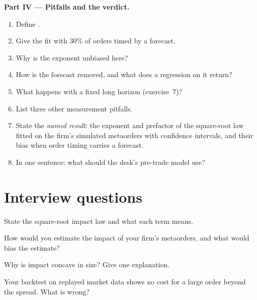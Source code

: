 \begin{problem}
\medskip\noindent\textbf{Part IV --- Pitfalls and the verdict.}
\begin{enumerate}[resume]
\item Define .
\item Give the fit with 30\% of orders timed by a forecast.
\item Why is the exponent unbiased here?
\item How is the forecast removed, and what does a regression on it return?
\item What happens with a fixed long horizon (exercise~7)?
\item List three other measurement pitfalls.
\item State the \emph{named result}: the exponent and prefactor of the square-root law fitted on the firm's simulated metaorders with confidence intervals,
and their bias when order timing carries a forecast.
\item In one sentence: what should the desk's pre-trade model use?
\end{enumerate}
\end{problem}

\section{Interview questions}

\begin{interviewq}\label{iq:mx:the-empirics-of-price-impact:1}
State the square-root impact law and what each term means.
\end{interviewq}

\begin{interviewq}\label{iq:mx:the-empirics-of-price-impact:2}
How would you estimate the impact of your firm's metaorders, and what would bias the estimate?
\end{interviewq}

\begin{interviewq}\label{iq:mx:the-empirics-of-price-impact:3}
Why is impact concave in size? Give one explanation.
\end{interviewq}

\begin{interviewq}\label{iq:mx:the-empirics-of-price-impact:4}
Your backtest on replayed market data shows no cost for a large order beyond the spread. What is wrong?
\end{interviewq}

